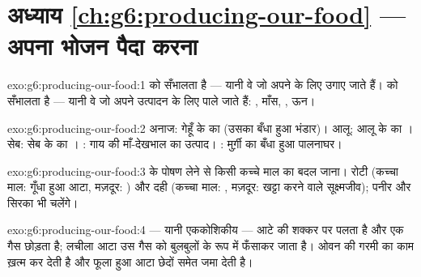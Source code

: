 \section*{अध्याय \ref{ch:g6:producing-our-food} --- अपना भोजन पैदा करना}

\begin{solution}{exo:g6:producing-our-food:1}
  को सँभालता है --- यानी वे  जो अपने  के लिए उगाए जाते हैं।   को सँभालता है --- यानी
वे  जो अपने उत्पादन के लिए पाले जाते हैं: , माँस, , ऊन।
\end{solution}

\begin{solution}{exo:g6:producing-our-food:2}
अनाज: गेहूँ के  का  (उसका बँधा हुआ भंडार)। आलू: आलू के  का
। सेब: सेब के  का । : गाय की माँ-देखभाल का उत्पाद। :
मुर्ग़ी का बँधा हुआ पालनाघर।
\end{solution}

\begin{solution}{exo:g6:producing-our-food:3}
 के पोषण लेने से किसी कच्चे माल का बदल जाना। रोटी (कच्चा
माल: गूँधा हुआ आटा, मज़दूर: ) और दही (कच्चा माल: , मज़दूर: खट्टा
करने वाले सूक्ष्मजीव); पनीर और सिरका भी चलेंगे।
\end{solution}

\begin{solution}{exo:g6:producing-our-food:4}
 --- यानी एककोशिकीय  --- आटे की शक्कर पर पलता है और एक गैस
छोड़ता है; लचीला आटा उस गैस को बुलबुलों के रूप में फँसाकर  जाता है।
ओवन की गरमी  का काम ख़त्म कर देती है और फूला हुआ आटा छेदों समेत जमा
देती है।
\end{solution}

